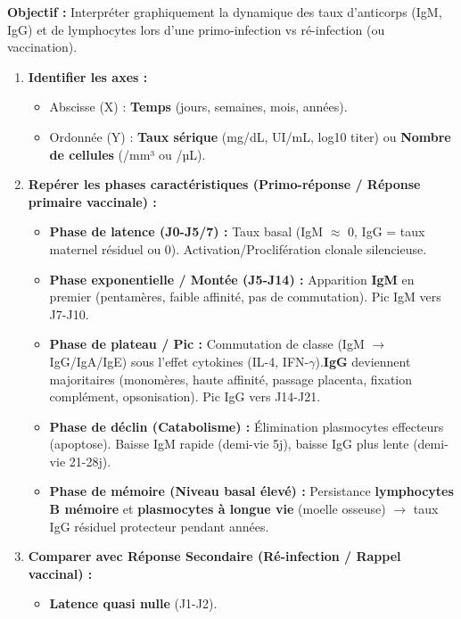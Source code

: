 \documentclass[11pt]{article}
\begin{document}
\begin{methode}
    \textbf{Objectif :} Interpréter graphiquement la dynamique des taux d'anticorps (IgM, IgG) et de lymphocytes lors d'une primo-infection vs ré-infection (ou vaccination).
    \begin{enumerate}
        \item \textbf{Identifier les axes :} 
        \begin{itemize}
            \item Abscisse (X) : \textbf{Temps} (jours, semaines, mois, années).
            \item Ordonnée (Y) : \textbf{Taux sérique} (mg/dL, UI/mL, log10 titer) ou \textbf{Nombre de cellules} (/mm³ ou /µL).
        \end{itemize}
        \item \textbf{Repérer les phases caractéristiques (Primo-réponse / Réponse primaire vaccinale) :}
        \begin{itemize}
            \item \textbf{Phase de latence (J0-J5/7) :} Taux basal (IgM $\approx$ 0, IgG = taux maternel résiduel ou 0). Activation/Proclifération clonale silencieuse.
            \item \textbf{Phase exponentielle / Montée (J5-J14) :} Apparition \textbf{IgM} en premier (pentamères, faible affinité, pas de commutation). Pic IgM vers J7-J10.
            \item \textbf{Phase de plateau / Pic :} Commutation de classe (IgM $\rightarrow$ IgG/IgA/IgE) sous l'effet cytokines (IL-4, IFN-$\gamma$).\textbf{IgG} deviennent majoritaires (monomères, haute affinité, passage placenta, fixation complément, opsonisation). Pic IgG vers J14-J21.
            \item \textbf{Phase de déclin (Catabolisme) :} Élimination plasmocytes effecteurs (apoptose). Baisse IgM rapide (demi-vie 5j), baisse IgG plus lente (demi-vie 21-28j).
            \item \textbf{Phase de mémoire (Niveau basal élevé) :} Persistance \textbf{lymphocytes B mémoire} et \textbf{plasmocytes à longue vie} (moelle osseuse) $\rightarrow$ taux IgG résiduel protecteur pendant années.
        \end{itemize}
        \item \textbf{Comparer avec Réponse Secondaire (Ré-infection / Rappel vaccinal) :}
        \begin{itemize}
            \item \textbf{Latence quasi nulle} (J1-J2).

\end{itemize}
\end{enumerate}
\end{methode}
\end{document}
